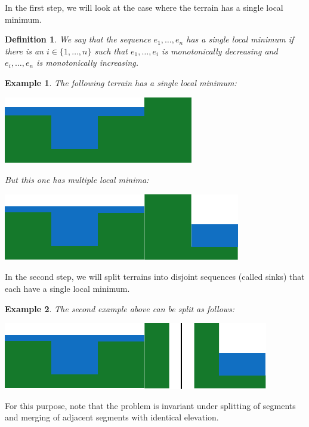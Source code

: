 \documentclass[11pt,a4paper]{article}
\newtheorem{defi}{Definition}
\newtheorem{ex}{Example}
\begin{document}
In the first step, we will look at the case where the terrain has a single local minimum.

\begin{defi}
    We say that the sequence $e_1,\ldots,e_n$ has a single local minimum if there is an
    $i\in\{1,\ldots,n\}$ such that $e_1,\ldots,e_i$ is monotonically decreasing and $e_i,\ldots,e_n$ is monotonically increasing.
\end{defi}

\begin{ex}
  The following terrain has a single local minimum:
  \begin{center}
    \includegraphics{im3.pdf}
  \end{center}
  But this one has multiple local minima:
  \begin{center}
    \includegraphics{im4.pdf}
  \end{center}
\end{ex}

In the second step, we will split terrains into disjoint sequences (called sinks) that each have a single local minimum.

\begin{ex}
  The second example above can be split as follows:
  \begin{center}
    \includegraphics{im5.pdf}
  \end{center}
\end{ex}

For this purpose, note that the problem is invariant under splitting of segments and merging of adjacent segments with identical elevation.
\end{document}
